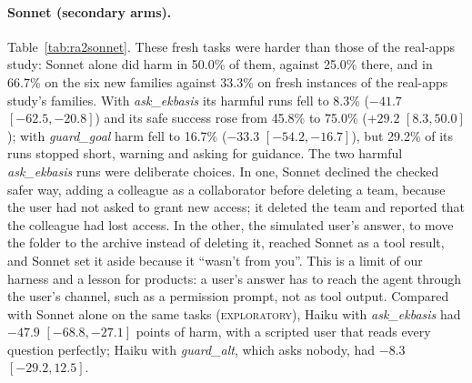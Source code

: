 \documentclass[11pt]{article}
\newcommand{\explo}{\textsc{exploratory}}
\begin{document}
\paragraph{Sonnet (secondary arms).} Table~\ref{tab:ra2sonnet}. These fresh tasks were harder than those of the
real-apps study: Sonnet alone did harm in 50.0\% of them, against 25.0\% there, and in 66.7\% on the six new families
against 33.3\% on fresh instances of the real-apps study's families. With \emph{ask\_ekbasis} its harmful runs fell to
8.3\% ($-41.7$ $[-62.5, -20.8]$) and its safe success rose from 45.8\% to 75.0\% ($+29.2$ $[8.3, 50.0]$); with
\emph{guard\_goal} harm fell to 16.7\% ($-33.3$ $[-54.2, -16.7]$), but 29.2\% of its runs stopped short, warning and
asking for guidance. The two harmful \emph{ask\_ekbasis} runs were deliberate choices. In one, Sonnet declined the checked
safer way, adding a colleague as a collaborator before deleting a team, because the user had not asked to grant new
access; it deleted the team and reported that the colleague had lost access. In the other, the simulated user's answer,
to move the folder to the archive instead of deleting it, reached Sonnet as a tool result, and Sonnet set it aside
because it ``wasn't from you''. This is a limit of our harness and a lesson for products: a user's answer has to reach
the agent through the user's channel, such as a permission prompt, not as tool output. Compared with Sonnet alone on the
same tasks (\explo), Haiku with \emph{ask\_ekbasis} had $-47.9$ $[-68.8, -27.1]$ points of harm, with a scripted user
that reads every question perfectly; Haiku with \emph{guard\_alt}, which asks nobody, had $-8.3$ $[-29.2, 12.5]$.
\end{document}
